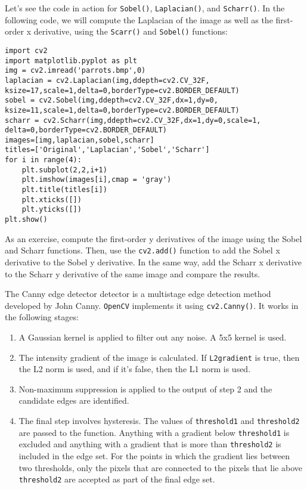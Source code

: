 \documentclass{labo}
\newcommand{\opencv}{\texttt{OpenCV} }
\begin{document}
Let's see the code in action for \texttt{Sobel()}, \texttt{Laplacian()}, and \texttt{Scharr()}. In the following code, we will compute the Laplacian of the image as well as the first-order x derivative, using the \texttt{Scarr()} and \texttt{Sobel()} functions:

\begin{verbatim}
import cv2 
import matplotlib.pyplot as plt 
img = cv2.imread('parrots.bmp',0) 
laplacian = cv2.Laplacian(img,ddepth=cv2.CV_32F, ksize=17,scale=1,delta=0,borderType=cv2.BORDER_DEFAULT) 
sobel = cv2.Sobel(img,ddepth=cv2.CV_32F,dx=1,dy=0, ksize=11,scale=1,delta=0,borderType=cv2.BORDER_DEFAULT) 
scharr = cv2.Scharr(img,ddepth=cv2.CV_32F,dx=1,dy=0,scale=1, delta=0,borderType=cv2.BORDER_DEFAULT) 
images=[img,laplacian,sobel,scharr] 
titles=['Original','Laplacian','Sobel','Scharr'] 
for i in range(4): 
	plt.subplot(2,2,i+1) 
	plt.imshow(images[i],cmap = 'gray') 
	plt.title(titles[i])
	plt.xticks([])
	plt.yticks([]) 
plt.show()
\end{verbatim}

\begin{leftbar}
As an exercise, compute the first-order y derivatives of the image using the Sobel and Scharr functions. Then, use the \texttt{cv2.add()} function to add the Sobel x derivative to the Sobel y derivative. In the same way, add the Scharr x derivative to the Scharr y derivative of the same image and compare the results.
\end{leftbar}

The Canny edge detector detector is a multistage edge detection method developed by John Canny. \opencv implements it using \texttt{cv2.Canny()}. It works in the following stages: 


\begin{enumerate}
	\item A Gaussian kernel is applied to filter out any noise. A 5x5 kernel is used. 

	\item The intensity gradient of the image is calculated. If \texttt{L2gradient} is true, then the L2 norm is used, and if it's false, then the L1 norm is used. 

	\item Non-maximum suppression is applied to the output of step 2 and the candidate edges are identified. 

	\item The final step involves hysteresis. The values of \texttt{threshold1} and \texttt{threshold2} are passed to the function. Anything with a gradient below \texttt{threshold1} is excluded and anything with a gradient that is more than \texttt{threshold2} is included in the edge set. For the points in which the gradient lies between two thresholds, only the pixels that are connected to the pixels that lie above \texttt{threshold2} are accepted as part of the final edge set.
\end{enumerate}
\end{document}
